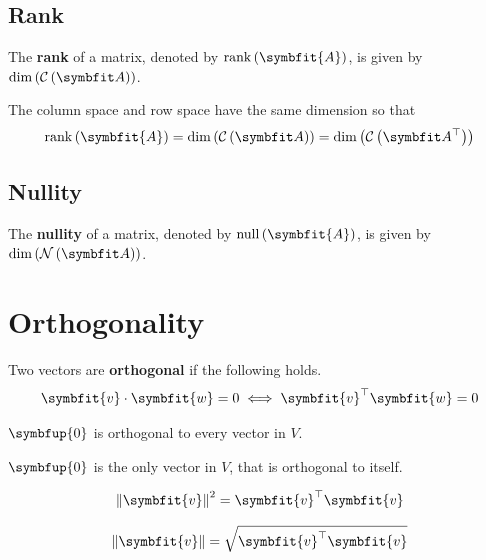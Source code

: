 \documentclass{article}
\begin{document}
\subsection{Rank}
\begin{definition}
    The \textbf{rank} of a matrix, denoted by
    \(\rank{\left( \symbfit{A} \right)}\), is given by
    \(\dim{\left( \columnspace{A} \right)}\).
\end{definition}
\begin{theorem}
    The column space and row space have the same dimension so that
    \begin{equation*}
        \rank{\left( \symbfit{A} \right)}=\dim{\left( \columnspace{A} \right)}=\dim{\left( \rowspace{A} \right)}
    \end{equation*}
\end{theorem}
\subsection{Nullity}
\begin{definition}
    The \textbf{nullity} of a matrix, denoted by
    \(\vnull{\left( \symbfit{A} \right)}\), is given by
    \(\dim{\left( \nullspace{A} \right)}\).
\end{definition}
\newpage
\section{Orthogonality}
\begin{definition}
    Two vectors are \textbf{orthogonal} if the following holds.
    \begin{equation*}
        \symbfit{v}\cdot \symbfit{w}=0 \iff \symbfit{v}^{\top}\symbfit{w}=0
    \end{equation*}
\end{definition}
\begin{theorem}
    \(\symbfup{0}\) is orthogonal to every vector in \(V\).
\end{theorem}
\begin{theorem}
    \(\symbfup{0}\) is the only vector in \(V\), that is orthogonal to
    itself.
\end{theorem}
\begin{theorem}
    \begin{equation*}
        \norm{\symbfit{v}}^2=\symbfit{v}^{\top}\symbfit{v}
    \end{equation*}
\end{theorem}
\begin{theorem}
    \begin{equation*}
        \norm{\symbfit{v}}=\sqrt{\symbfit{v}^{\top}\symbfit{v}}
    \end{equation*}
\end{theorem}
\end{document}

